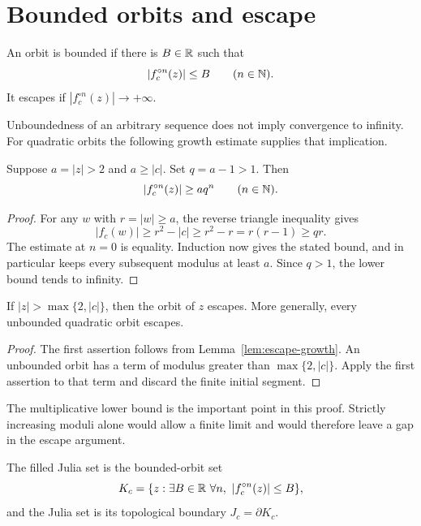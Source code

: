 \section{Bounded orbits and escape}

\begin{definition}
An orbit is bounded if there is $B\in\mathbb R$ such that
\[
 |f_c^{\circ n}(z)|\le B\qquad(n\in\mathbb N).
\]
It escapes if $|f_c^{\circ n}(z)|\to+\infty$.
\end{definition}

Unboundedness of an arbitrary sequence does not imply convergence to
infinity.  For quadratic orbits the following growth estimate supplies
that implication.

\begin{lemma}
\label{lem:escape-growth}
Suppose $a=|z|>2$ and $a\ge|c|$.  Set $q=a-1>1$.  Then
\[
 |f_c^{\circ n}(z)|\ge a q^n\qquad(n\in\mathbb N).
\]
\end{lemma}

\begin{proof}
For any $w$ with $r=|w|\ge a$, the reverse triangle inequality gives
\[
 |f_c(w)|\ge r^2-|c|
       \ge r^2-r=r(r-1)\ge qr.
\]
The estimate at $n=0$ is equality.  Induction now gives the stated bound,
and in particular keeps every subsequent modulus at least $a$.
Since $q>1$, the lower bound tends to infinity.
\end{proof}

\begin{theorem}
\label{thm:escape-radius}
If $|z|>\max\{2,|c|\}$, then the orbit of $z$ escapes.  More generally,
every unbounded quadratic orbit escapes.
\end{theorem}

\begin{proof}
The first assertion follows from Lemma~\ref{lem:escape-growth}.  An
unbounded orbit has a term of modulus greater than
$\max\{2,|c|\}$.  Apply the first assertion to that term and discard the
finite initial segment.
\end{proof}

The multiplicative lower bound is the important point in this proof.
Strictly increasing moduli alone would allow a finite limit and would
therefore leave a gap in the escape argument.

\begin{definition}
\label{def:filled-julia}
The filled Julia set is the bounded-orbit set
\[
 K_c=\{z:\exists B\in\mathbb R\ \forall n,\ |f_c^{\circ n}(z)|\le B\},
\]
and the Julia set is its topological boundary $J_c=\partial K_c$.
\end{definition}

